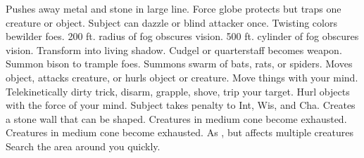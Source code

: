     {Pushes away metal and stone in large line.}
    {Force globe protects but traps one creature or object.}
    {Subject can dazzle or blind attacker once.}
    {Twisting colors bewilder foes.}
    {200 ft. radius of fog obscures vision.}
    {500 ft. cylinder of fog obscures vision.}
    {Transform into living shadow.}
    {Cudgel or quarterstaff becomes  weapon.}
    {Summon bison to trample foes.}
    {Summons swarm of bats, rats, or spiders.}
    {Moves object, attacks creature, or hurls object or creature.}
    {Move things with your mind.}
    {Telekinetically dirty trick, disarm, grapple, shove, trip your target.}
    {Hurl objects with the force of your mind.}
    {Subject takes  penalty to Int, Wis, and Cha.}
    {Creates a stone wall that can be shaped.}
    {Creatures in medium cone become exhausted.}
    {Creatures in medium cone become exhausted.}
    {As , but affects multiple creatures}
    {Search the area around you quickly.}
